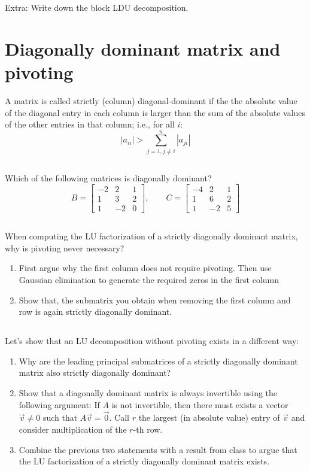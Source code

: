 \documentclass[11pt,letterpaper]{report}
\begin{document}
Extra: Write down the block LDU decomposition. 

\section{Diagonally dominant matrix and pivoting}
A matrix is called strictly (column) diagonal-dominant if the
 the absolute value of the diagonal entry in each column is larger than
 the sum of the absolute values of the other entries in that
 column; i.e., for all $i$:
 $$
 |a_{ii}|>\sum_{j=1, j\not=i}^n |a_{ji}|
 $$
 
\subsection{}
Which of the following matrices is diagonally dominant?
$$
 B={\begin{bmatrix}-2&2&1\\1&3&2\\1&-2&0\end{bmatrix}}, \qquad
 C={\begin{bmatrix}-4&2&1\\1&6&2\\1&-2&5\end{bmatrix}}
$$

\subsection{}
When computing the LU
 factorization of a strictly diagonally dominant matrix, why is
 pivoting never necessary? 

\begin{enumerate}
    \item First argue why the first column does not require pivoting. Then use Gaussian elimination to generate the required zeros in the first column
    \item Show that, the submatrix you obtain when removing the first column and row is again strictly  diagonally dominant.
\end{enumerate}

\subsection{}
Let's show that an LU decomposition without pivoting exists in a different way:
  \begin{enumerate}
    \item Why are the leading principal submatrices of a strictly
      diagonally dominant matrix also strictly diagonally dominant?
    \item Show that a diagonally dominant matrix is always invertible
      using the following argument: If $A$ is not invertible, then
      there must exists a vector $\vec v\not=0$ such that
      $A\vec v = \vec 0$. Call $r$ the largest (in
      absolute value) entry of $\vec v$ and consider
      multiplication of the $r$-th row. 
    \item Combine the previous two statements with a result from class
      to argue that the LU factorization of a strictly diagonally
      dominant matrix exists.
 \end{enumerate}
 
\end{document}
